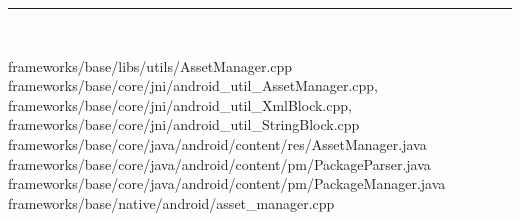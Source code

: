 \documentclass[a4paper,11pt]{article}
\begin{document}
\appendix
{}
\begin{appendices} 
\end{appendices}

\noindent\rule[-1ex]{\textwidth}{3pt}\\[2.0ex] 
\begin{thebibliography}{主要代码}
    frameworks/base/libs/utils/AssetManager.cpp
    frameworks/base/core/jni/android_util_AssetManager.cpp,
    frameworks/base/core/jni/android_util_XmlBlock.cpp,
    frameworks/base/core/jni/android_util_StringBlock.cpp
    frameworks/base/core/java/android/content/res/AssetManager.java
    frameworks/base/core/java/android/content/pm/PackageParser.java
    frameworks/base/core/java/android/content/pm/PackageManager.java
    frameworks/base/native/android/asset_manager.cpp
\end{thebibliography}
\printindex
\end{document}
